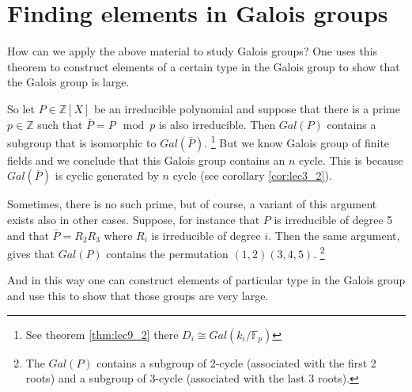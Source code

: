 \section{Finding elements in Galois groups}
How can we apply the above material to study Galois groups? One uses
this theorem to construct elements of a certain type in the 
Galois group to show that the Galois group is large.

So let $P \in \mathbb{Z}\left[X\right]$ be an
irreducible polynomial and suppose that there is a prime
$p \in \mathbb{Z}$ such that $\bar{P} = P \mod p$ is also irreducible.
Then $Gal\left(P\right)$ contains a subgroup that is isomorphic to 
$Gal\left(\bar{P}\right)$.
\footnote{
  See theorem \ref{thm:lec9_2} there
  $D_i \cong Gal\left(k_i/\mathbb{F}_p\right)$
}
But we know Galois group of finite fields
and we conclude that this Galois group contains an $n$ cycle.
This is because $Gal\left(\bar{P}\right)$ is cyclic generated by $n$
cycle (see corollary \ref{cor:lec3_2}).

Sometimes, there is no such prime, but of course, a variant of this
argument exists also in other cases. Suppose, for instance that $P$ is
irreducible of degree 5 and that 
$\bar{P} = R_2 R_3$ where $R_i$ is irreducible of degree $i$.
Then the same argument, gives that
$Gal\left(P\right)$ contains the permutation $(1,2)(3,4,5)$.
\footnote{
  The $Gal\left(P\right)$ contains a subgroup of 2-cycle (associated
  with the first 2 roots) and a
  subgroup of 3-cycle (associated with the last 3 roots).
}

And in this way one can construct elements of particular type in the
Galois group and use this to show that those groups are very large.  

